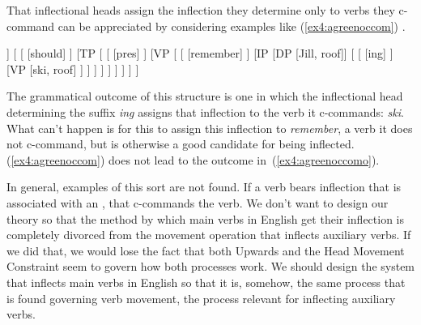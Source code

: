 That inflectional heads assign the inflection they determine only to verbs they c-command can be appreciated by considering examples like (\ref{ex4:agreenoccom}) .
\begin{exe}
\ex \label{ex4:agreenoccom}
\small
\begin{forest}
[AgrP
	[DP [Bart, roof]]
	[ 
		[ [should] ]
		[TP [
			[ [pres] ]
			[VP [
				[ ]
				[IP 
					[DP [Jill, roof]]
					[
						[ [ing] ]
						[VP [ski, roof] ]
					 ]
				]
			] ]
		] ]
	]
]
\end{forest}
\end{exe}
The grammatical outcome of this structure is one in which the inflectional head determining the suffix \emph{ing} assigns that inflection to the verb it c-commands: \emph{ski}. What can't happen is for this  to assign this inflection to \emph{remember}, a verb it does not c-command, but is otherwise a good candidate for being inflected. (\ref{ex4:agreenoccom}) does not lead to the outcome in~(\ref{ex4:agreenoccomo}).
\begin{exe}
\end{exe}
In general, examples of this sort are not found. If a verb bears inflection that is associated with an , that  c-commands the verb. We don't want to design our theory so that the method by which main verbs in English get their inflection is completely divorced from the movement operation that inflects auxiliary verbs. If we did that, we would lose the fact that both Upwards and the Head Movement Constraint seem to govern how both processes work. We should design the system that inflects main verbs in English so that it is, somehow, the same process that is found governing verb movement, the process relevant for inflecting auxiliary verbs.

